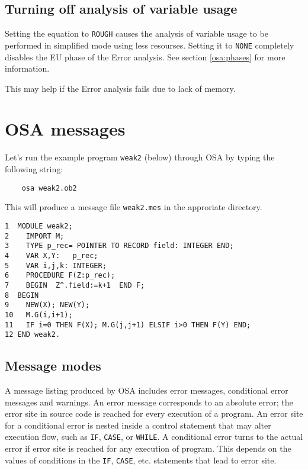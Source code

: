 \subsection{Turning off analysis of variable usage}
\label{osa:speedup:noeua}

Setting the equation  to \verb'ROUGH' causes the analysis of 
variable usage to be performed in simplified mode using less resourses.
Setting it to \verb'NONE' completely disables the EU phase of the 
Error analysis. See section \ref{osa:phases} for more information.

This may help if the Error analysis fails due to lack of memory.


\section{OSA messages}
\label{osa:msg}

{\samepage
Let's run the example program \verb'weak2' (below) through OSA by typing
the following string: 

\verb'    osa weak2.ob2'

This will produce a message file \verb'weak2.mes' in the approriate 
directory.

\begin{verbatim}
1  MODULE weak2;
2    IMPORT M;
3    TYPE p_rec= POINTER TO RECORD field: INTEGER END;
4    VAR X,Y:   p_rec;
5    VAR i,j,k: INTEGER;
6    PROCEDURE F(Z:p_rec);
7    BEGIN  Z^.field:=k+1  END F;
8  BEGIN
9    NEW(X); NEW(Y);
10   M.G(i,i+1);
11   IF i=0 THEN F(X); M.G(j,j+1) ELSIF i>0 THEN F(Y) END;
12 END weak2.
\end{verbatim}
} %


\subsection{Message modes}
\label{osa:msg:modes}

A message listing produced by OSA includes error messages,
conditional error messages and warnings. An
error message corresponds to an absolute error; 
the error site in source code is reached for
every execution of a program. An error site for a conditional
error is nested inside a control statement that may alter execution flow,
such as \verb'IF', \verb'CASE', or \verb'WHILE'.
A conditional error turns to the actual error if error site is
reached for any execution of program. This depends on the values of
conditions in the \verb'IF', \verb'CASE', etc. statements that lead to 
error site.

